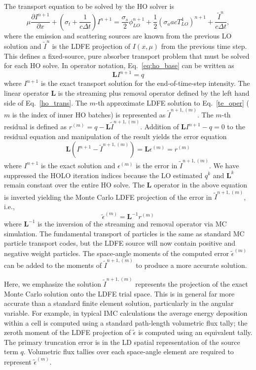 \documentclass[11pt]{article}
\newcommand{\pderiv}[2]{\frac{\partial #1}{\partial #2}}
\newcommand{\B}[1]{\ensuremath{\mathbf{#1}}}
\begin{document}
The transport equation to be solved by the HO solver is
\begin{equation}\label{eq:ho_base}
\mu \pderiv{I^{n+1}}{x} + \left(\sigma_t + \frac{1}{c \Delta t }\right)
I^{n+1}
= \frac{\sigma_s}{2} \phi_{LO}^{n+1} +\frac{1}{2} \left(\sigma_a a c T_{LO}^4
\right)^{n+1} + \frac{\tilde I^n}{c\Delta t},
\end{equation}
where the emission and scattering sources are known from the previous LO solution and
$\tilde{I}^n$ is the LDFE projection of $I(x,\mu)$ from the previous time step.
 This defines a 
fixed-source, pure absorber transport problem that must be solved for each HO solve. 
In operator notation, Eq.~\eqref{eq:ho_base} can be written as
\begin{equation}\label{te_oper}
    \B L I^{n+1} = q
\end{equation}
where $I^{n+1}$ is the exact transport solution for the end-of-time-step intensity.
The linear operator $\B L$ is the streaming plus
removal operator defined by the left hand
side of Eq.~\eqref{ho_trans}.
The $m$-th approximate LDFE solution to Eq.~\eqref{te_oper} ($m$ is the index of inner HO
batches) is represented as
$\tilde{I}^{n+1,(m)}$.    
The $m$-th residual is defined as $r^{(m)} = q - \B L\tilde{I}^{n+1,(m)}.$ 
Addition of $\B L I^{n+1} - q=0$ to the residual equation 
and manipulation of the result yields the error equation
\begin{equation}
    \B L (I^{n+1} - \tilde{I}^{n+1,(m)}) = \B L {\epsilon}^{(m)} = r^{(m)}
\end{equation}
where $I^{n+1}$ is the exact solution and ${\epsilon}^{(m)}$ is the error in
$\tilde{I}^{n+1,(m)}$. 
We have suppressed the HOLO iteration indices because the LO estimated $q^{k}$ and $\B L^{k}$ remain constant over the entire HO solve.
The $\B L$ operator in the above equation is inverted yielding
the Monte Carlo LDFE projection of the error in $\tilde{I}^{n+1,(m)}$, i.e., 
\begin{equation}
\tilde{\epsilon}^{(m)} = \B L^{-1} r^{(m)}
\end{equation}
where $\B L^{-1}$ is the inversion of the streaming and removal operator via MC
simulation.  The fundamental transport of particles is the same
as standard MC particle transport codes, but the LDFE source will now contain positive and
negative weight particles.
 The space-angle moments of the computed error $\tilde{\epsilon}^{(m)}$ can be added to the moments of
$\tilde{I}^{n+1,(m)}$ to produce a more accurate solution.

Here, we emphasize the solution $\tilde{I}^{n+1,(m)}$ represents the projection of the exact Monte Carlo
solution onto the LDFE trial space.  This is in general far more accurate than a standard
finite element solution, particularly in the angular variable.  For example, in typical IMC calculations the average energy
deposition within a cell is computed using a standard path-length volumetric flux
tally; the zeroth moment of the LDFE projection of $\tilde{\epsilon}$ is computed
using an equivalent tally.  The primary truncation error is in the LD spatial
representation of the source term $q$.  Volumetric flux tallies over
each space-angle element are required to represent $\tilde{\epsilon}^{(m)}$.  
\end{document}
